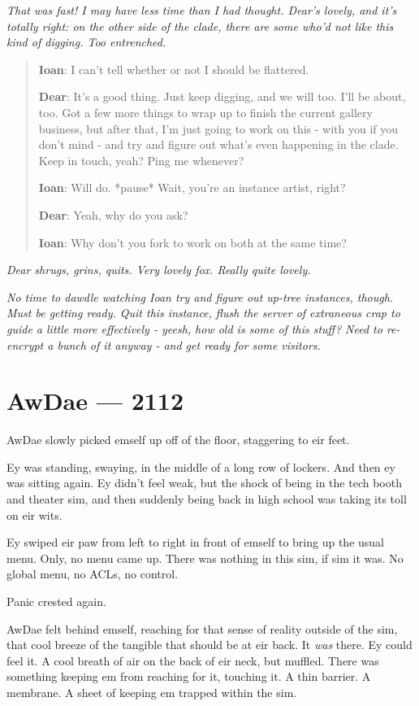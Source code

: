 \emph{That was fast! I may have less time than I had thought. Dear's lovely, and it's totally right: on the other side of the clade, there are some who'd not like this kind of digging. Too entrenched.}

\begin{quote}
\textbf{Ioan}: I can't tell whether or not I should be flattered.

\textbf{Dear}: It's a good thing. Just keep digging, and we will too. I'll be about, too. Got a few more things to wrap up to finish the current gallery business, but after that, I'm just going to work on this - with you if you don't mind - and try and figure out what's even happening in the clade. Keep in touch, yeah? Ping me whenever?

\textbf{Ioan}: Will do. *pause* Wait, you're an instance artist, right?

\textbf{Dear}: Yeah, why do you ask?

\textbf{Ioan}: Why don't you fork to work on both at the same time?
\end{quote}

\emph{Dear shrugs, grins, quits. Very lovely fox. Really quite lovely.}

\emph{No time to dawdle watching Ioan try and figure out up-tree instances, though. Must be getting ready. Quit this instance, flush the server of extraneous crap to guide a little more effectively - yeesh, how old is some of this stuff? Need to re-encrypt a bunch of it anyway - and get ready for some visitors.}

\chapter*{AwDae — 2112}

AwDae slowly picked emself up off of the floor, staggering to eir feet.

Ey was standing, swaying, in the middle of a long row of lockers. And then ey was sitting again. Ey didn't feel weak, but the shock of being in the tech booth and theater sim, and then suddenly being back in high school was taking its toll on eir wits.

Ey swiped eir paw from left to right in front of emself to bring up the usual menu. Only, no menu came up. There was nothing in this sim, if sim it was. No global menu, no ACLs, no control.

Panic crested again.

AwDae felt behind emself, reaching for that sense of reality outside of the sim, that cool breeze of the tangible that should be at eir back. It \emph{was} there. Ey could feel it. A cool breath of air on the back of eir neck, but muffled. There was something keeping em from reaching for it, touching it. A thin barrier. A membrane. A sheet of keeping em trapped within the sim.


